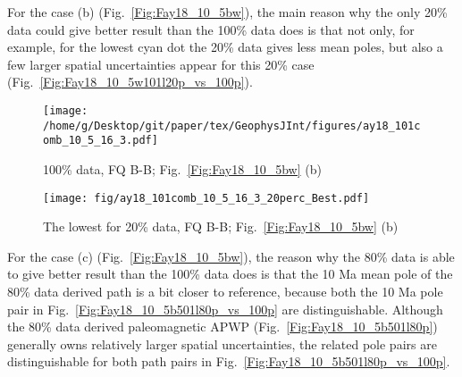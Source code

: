 For the case (b) (Fig.~\ref{Fig:Fay18_10_5bw}), the main reason why the only
20\% data could give better result than the 100\% data does is that not only,
for example, for the lowest cyan dot the 20\% data gives less mean poles, but
also a few larger spatial uncertainties appear for this 20\% case
(Fig.~\ref{Fig:Fay18_10_5w101l20p_vs_100p}).

\begin{figure*}[tbp]
  \captionsetup[subfigure]{labelformat=empty,aboveskip=-6pt,belowskip=-6pt}
  \centering
  \begin{subfigure}[htbp]{.49\textwidth}
    \captionsetup{skip=0pt}
    \centering
    \texttt{[image: /home/g/Desktop/git/paper/tex/GeophysJInt/figures/ay18\_101comb\_10\_5\_16\_3.pdf]}
	\caption{100\% data, FQ B-B; Fig.~\ref{Fig:Fay18_10_5bw}
	(b)}\label{Fig:Fay18_10_5w101}
  \end{subfigure}
  \begin{subfigure}[htbp]{.49\textwidth}
    \captionsetup{skip=0pt}
    \centering
    \texttt{[image: fig/ay18\_101comb\_10\_5\_16\_3\_20perc\_Best.pdf]}  %
    \caption{The lowest for 20\% data, FQ B-B;
	Fig.~\ref{Fig:Fay18_10_5bw} (b)}\label{Fig:Fay18_10_5w101l20p}
  \end{subfigure}
  \caption[Less data, better similarity?]{Comparing the 100\% North American
  120 Ma paleomagnetic data derived result with the best of the only
  20\% data (giving even better similarity) derived results (the green dot in
  Fig.~\ref{Fig:Fay18_10_5bw} (b)).}\label{Fig:Fay18_10_5w101l20p_vs_100p}
\end{figure*}

For the case (c) (Fig.~\ref{Fig:Fay18_10_5bw}), the reason why the 80\% data is
able to give better result than the 100\% data does is that the 10 Ma mean pole
of the 80\% data derived path is a bit closer to reference, because both the 10
Ma pole pair in Fig.~\ref{Fig:Fay18_10_5b501l80p_vs_100p} are distinguishable.
Although the 80\% data derived paleomagnetic APWP
(Fig.~\ref{Fig:Fay18_10_5b501l80p}) generally owns relatively larger spatial
uncertainties, the related pole pairs are distinguishable for both path pairs in
Fig.~\ref{Fig:Fay18_10_5b501l80p_vs_100p}.

